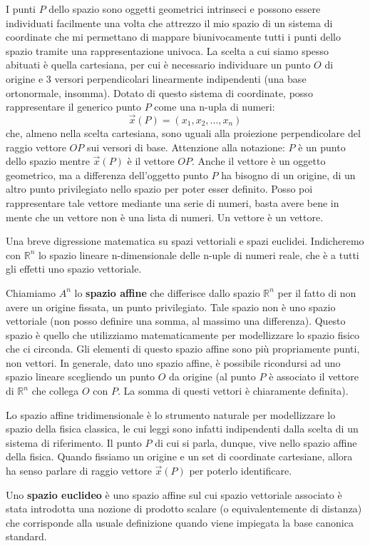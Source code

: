 \documentclass[a4paper,openany]{article}
\begin{document}
	I punti $P$ dello spazio sono oggetti geometrici intrinseci e possono essere individuati facilmente una volta che attrezzo il mio spazio di un sistema di coordinate che mi permettano di mappare biunivocamente tutti i punti dello spazio tramite una rappresentazione univoca. La scelta a cui siamo spesso abituati è quella cartesiana, per cui è necessario individuare un punto $O$ di origine e 3 versori perpendicolari linearmente indipendenti (una base ortonormale, insomma). Dotato di questo sistema di coordinate, posso rappresentare il generico punto $P$ come una n-upla di numeri:
	\begin{equation}
		\vec{x}(P) = (x_{1}, x_{2}, ..., x_{n})
		\label{RapprP}
	\end{equation}
	che, almeno nella scelta cartesiana, sono uguali alla proiezione perpendicolare del raggio vettore $OP$ sui versori di base. Attenzione alla notazione: $P$ è un punto dello spazio mentre $\vec{x}(P)$ è il vettore $OP$. Anche il vettore è un oggetto geometrico, ma a differenza dell'oggetto punto $P$ ha bisogno di un origine, di un altro punto privilegiato nello spazio per poter esser definito. Posso poi rappresentare tale vettore mediante una serie di numeri, basta avere bene in mente che un vettore non è una lista di numeri. Un vettore è un vettore.
	\begin{tcolorbox}
		
		Una breve digressione matematica su spazi vettoriali e spazi euclidei. Indicheremo con $\mathbb{R}^{n}$ lo spazio lineare n-dimensionale delle n-uple di numeri reale, che è a tutti gli effetti uno spazio vettoriale.
		
		Chiamiamo $A^{n}$ lo \textbf{spazio affine} che differisce dallo spazio $\mathbb{R}^{n}$ per il fatto di non avere un origine fissata, un punto privilegiato. Tale spazio non è uno spazio vettoriale (non posso definire una somma, al massimo una differenza). Questo spazio è quello che utilizziamo matematicamente per modellizzare lo spazio fisico che ci circonda. Gli elementi di questo spazio affine sono più propriamente punti, non vettori. In generale, dato uno spazio affine, è possibile ricondursi ad uno spazio lineare scegliendo un punto $O$ da origine (al punto $P$ è associato il vettore di $\mathbb{R}^{n}$ che collega $O$ con $P$. La somma di questi vettori è chiaramente definita).
		
		Lo spazio affine tridimensionale è lo strumento naturale per modellizzare lo spazio della fisica classica, le cui leggi sono infatti indipendenti dalla scelta di un sistema di riferimento. Il punto $P$ di cui si parla, dunque, vive nello spazio affine della fisica. Quando fissiamo un origine e un set di coordinate cartesiane, allora ha senso parlare di raggio vettore $\vec{x}(P)$ per poterlo identificare.
		
		
		Uno \textbf{spazio euclideo} è uno spazio affine sul cui spazio vettoriale associato è stata introdotta una nozione di prodotto scalare (o equivalentemente di distanza) che corrisponde alla usuale definizione quando viene impiegata la base canonica standard.
		
	\end{tcolorbox}
	
\end{document}

